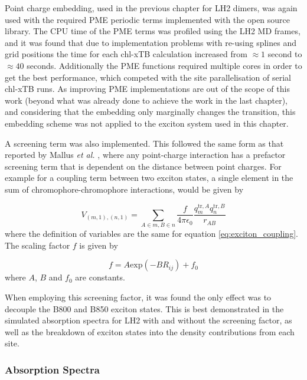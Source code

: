Point charge embedding, used in the previous chapter for LH2 dimers, was again used
with the required PME periodic terms implemented with the open source 
library. The CPU time of the PME terms was profiled using the LH2 MD frames, and
it was found that due to implementation problems with re-using splines and grid 
positions the time for each chl-xTB calculation increased from $\approx 1$ second
to $\approx 40$ seconds. Additionally the PME functions required multiple cores 
in order to get the best performance, which competed with the site parallelisation
of serial chl-xTB runs. As improving PME implementations are out of the scope of
this work (beyond what was already done to achieve the work in the last chapter),
and considering that the embedding only marginally changes the \Qy transition, 
this embedding scheme was not applied to the exciton system used in this chapter.

A screening term was also implemented. This followed the same form as that reported
by Mallus \emph{et al.} \cite{Mallus2018}, where any point-charge interaction has
a prefactor screening term that is dependent on the distance between point charges.
For example for a coupling term between two exciton states, a single element in 
the sum of chromophore-chromophore interactions, would be given by

\begin{equation}
    V_{\left(m, 1\right), \left(n,1\right)} = \sum_{A \in m, B \in n} \frac{f}{4\pi\epsilon_0} \frac{q^{\text{tr},A}_m q^{\text{tr},B}_n}{r_{AB}}
    \label{eq:exciton_coupling}
\end{equation}
%
where the definition of variables are the same for equation \ref{eq:exciton_coupling}.
The scaling factor $f$ is given by

\begin{equation}
    f = A \text{exp}\left(-B R_{ij}\right) + f_0
\end{equation}
%
where $A$, $B$ and $f_0$ are constants. 

When employing this screening factor, it was found the only effect was to decouple
the B800 and B850 exciton states. This is best demonstrated in the simulated absorption
spectra for LH2 with and without the screening factor, as well as the breakdown 
of exciton states into the density contributions from each site.

\subsubsection{Absorption Spectra}
\label{subsubsec:abs_spec}

